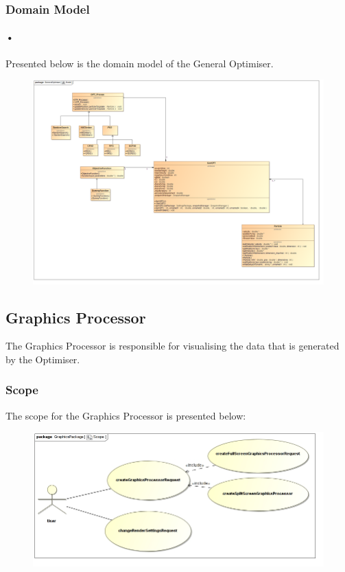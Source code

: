 \documentclass[11pt]{article}
\begin{document}
\subsubsection{Domain Model}
\paragraph{•}
Presented below is the domain model of the General Optimiser.
\begin{figure}[h]
\includegraphics[scale=0.2]{OPTModel.png}
\end{figure}

\subsection{Graphics Processor}
The Graphics Processor is responsible for visualising the data that is generated by the Optimiser. 

\subsubsection{Scope}
The scope for the Graphics Processor is presented below:
\begin{figure}[h]
\includegraphics[scale=0.45]{GraphicsProcessor/Scope.jpg}
\end{figure} 
\end{document}
